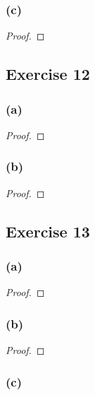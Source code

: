 \documentclass[14pt]{extarticle}
\begin{document}
\subsubsection{(c)}

\begin{proof}

\end{proof}

\subsection{Exercise 12}

\subsubsection{(a)}

\begin{proof}

\end{proof}

\subsubsection{(b)}

\begin{proof}

\end{proof}

\subsection{Exercise 13}

\subsubsection{(a)}

\begin{proof}

\end{proof}

\subsubsection{(b)}

\begin{proof}

\end{proof}

\subsubsection{(c)}
\end{document}
